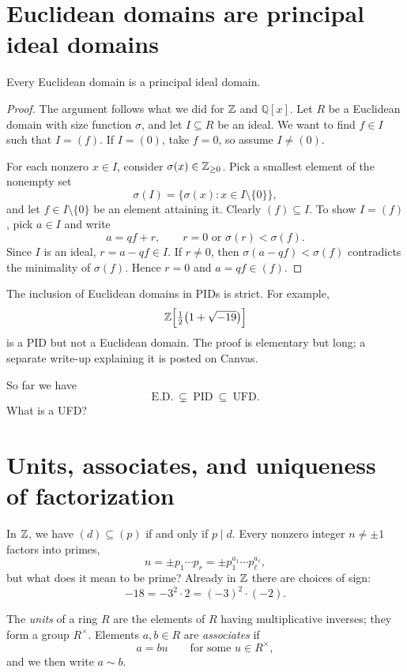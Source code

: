 \documentclass[reqno,11pt]{amsart}
\newcommand{\Q}{\mathbb{Q}}
\begin{document}
\section{Euclidean domains are principal ideal domains}

\begin{theorem}\label{thm:ed-pid}
Every Euclidean domain is a principal ideal domain.
\end{theorem}
\begin{proof}
The argument follows what we did for $\mathbb{Z}$ and $\Q[x]$.
Let $R$ be a Euclidean domain with size function $\sigma$, and let
$I\subseteq R$ be an ideal. We want to find $f\in I$ such that
$I=(f)$. If $I=(0)$, take $f=0$, so assume $I\neq(0)$.

For each nonzero $x\in I$, consider $\sigma(x)\in\mathbb{Z}_{\geq0}$.
Pick a smallest element of the nonempty set
\[
  \sigma(I)=\{\sigma(x):x\in I\setminus\{0\}\},
\]
and let $f\in I\setminus\{0\}$ be an element attaining it.
Clearly $(f)\subseteq I$. To show $I=(f)$, pick $a\in I$ and write
\[
  a=qf+r,\qquad r=0\text{ or }\sigma(r)<\sigma(f).
\]
Since $I$ is an ideal, $r=a-qf\in I$. If $r\neq0$, then
$\sigma(a-qf)<\sigma(f)$ contradicts the minimality of
$\sigma(f)$. Hence $r=0$ and $a=qf\in(f)$.
\end{proof}

\begin{remark}
The inclusion of Euclidean domains in PIDs is strict. For example,
\[
  \mathbb{Z}\Bigl[\tfrac12\bigl(1+\sqrt{-19}\bigr)\Bigr]
\]
is a PID but not a Euclidean domain. The proof is elementary but
long; a separate write-up explaining it is posted on Canvas.
\end{remark}

So far we have
\[
  \text{E.D.}\ \subsetneq\ \text{PID}\ \subseteq\ \text{UFD}.
\]
What is a UFD?

\section{Units, associates, and uniqueness of factorization}

In $\mathbb{Z}$, we have $(d)\subseteq(p)$ if and only if $p\mid d$.
Every nonzero integer $n\neq\pm1$ factors into primes,
\[
  n=\pm p_1\cdots p_r=\pm p_1^{a_1}\cdots p_\ell^{a_\ell},
\]
but what does it mean to be prime? Already in $\mathbb{Z}$ there are
choices of sign:
\[
  -18=-3^2\cdot2=(-3)^2\cdot(-2).
\]

\begin{define}
The \emph{units} of a ring $R$ are the elements of $R$ having
multiplicative inverses; they form a group $R^\times$. Elements
$a,b\in R$ are \emph{associates} if
\[
  a=bu\qquad\text{for some }u\in R^\times,
\]
and we then write $a\sim b$.
\end{define}
\end{document}
